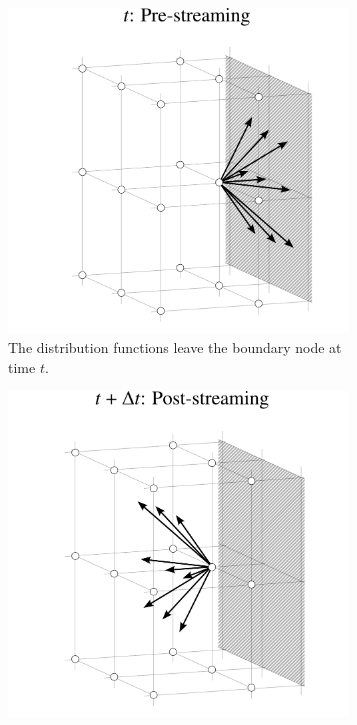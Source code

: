 \begin{figure}[H]
	\centering
	\begin{subfigure}{0.47\textwidth}
		\centering
		\includegraphics[width=0.99\textwidth, trim={0mm 0mm 0mm 0mm}]{figures/symmetric-a.pdf}
		\caption{The distribution functions leave the boundary node at time $t$.}
		\label{fig:sym a}
	\end{subfigure}\hfill%
	\begin{subfigure}{0.47\textwidth}
			\centering
			\includegraphics[width=0.99\textwidth, trim={0mm 0mm 0mm 0mm}]{figures/symmetric-b.pdf}

\end{subfigure}
\end{figure}
